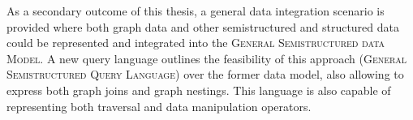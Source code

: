 

As a secondary outcome of this thesis, a general data integration scenario is provided where both graph data and other semistructured and structured data could be represented and integrated into the \textsc{General Semistructured data Model}. A new query language outlines the feasibility of this approach (\textsc{General Semistructured Query Language}) over the former data model, also allowing to express both graph joins and graph nestings. This language is also capable of representing both traversal and data manipulation operators.


